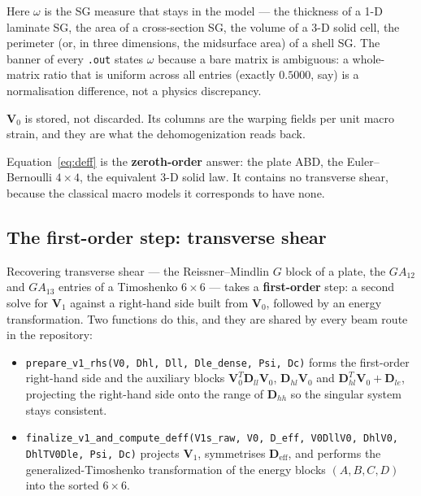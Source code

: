 Here $\omega$ is the SG measure that stays in the model --- the thickness of a
1-D laminate SG, the area of a cross-section SG, the volume of a 3-D solid cell,
the perimeter (or, in three dimensions, the midsurface area) of a shell SG. The
banner of every \texttt{.out} states $\omega$ because a bare matrix is
ambiguous: a whole-matrix ratio that is uniform across all entries (exactly
$0.5000$, say) is a normalisation difference, not a physics discrepancy.

$\mathbf{V}_0$ is stored, not discarded. Its columns are the warping fields per
unit macro strain, and they are what the dehomogenization reads back.

Equation~\eqref{eq:deff} is the \textbf{zeroth-order} answer: the plate ABD, the
Euler--Bernoulli $4\times4$, the equivalent 3-D solid law. It contains no
transverse shear, because the classical macro models it corresponds to have
none.

\subsection{The first-order step: transverse shear}

Recovering transverse shear --- the Reissner--Mindlin $G$ block of a plate, the
$GA_{12}$ and $GA_{13}$ entries of a Timoshenko $6\times6$ --- takes a
\textbf{first-order} step: a second solve for $\mathbf{V}_1$ against a
right-hand side built from $\mathbf{V}_0$, followed by an energy transformation.
Two functions do this, and they are shared by every beam route in the
repository:

\begin{itemize}
\item \texttt{prepare\_v1\_rhs(V0, Dhl, Dll, Dle\_dense, Psi, Dc)} forms the
      first-order right-hand side and the auxiliary blocks
      $\mathbf{V}_0^{T}\mathbf{D}_{ll}\mathbf{V}_0$,
      $\mathbf{D}_{hl}\mathbf{V}_0$ and
      $\mathbf{D}_{hl}^{T}\mathbf{V}_0 + \mathbf{D}_{le}$, projecting the
      right-hand side onto the range of $\mathbf{D}_{hh}$ so the singular
      system stays consistent.
\item \texttt{finalize\_v1\_and\_compute\_deff(V1s\_raw, V0, D\_eff, V0DllV0,
      DhlV0, DhlTV0Dle, Psi, Dc)} projects $\mathbf{V}_1$, symmetrises
      $\mathbf{D}_{\mathrm{eff}}$, and performs the generalized-Timoshenko
      transformation of the energy blocks $(A, B, C, D)$ into the sorted
      $6\times6$.
\end{itemize}

